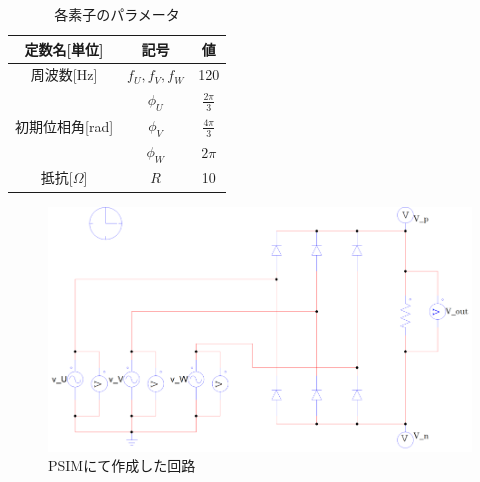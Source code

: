\documentclass[a4paper,12pt]{jarticle}
\begin{document}
\begin{table}[htb]
  \begin{center}
    \caption{各素子のパラメータ}
    \begin{tabular}{c|c|c} \hline
      定数名[単位] & 記号 & 値 \\ \hline \hline
      周波数[Hz] & $f_U,f_V,f_W$ & 120 \\ \hline
                     & $\phi_U$ & $\frac{2\pi}{3}$ \\
      初期位相角[rad] & $\phi_V$ & $\frac{4\pi}{3}$ \\
                     & $\phi_W$ & $2\pi$ \\ \hline
      抵抗[$\Omega$] & $R$ & 10 \\ \hline
    \end{tabular}
    \label{param}
  \end{center}
\end{table}

\begin{figure}[tb]
 \begin{center}
  \includegraphics[scale=1.3]{../figure/circuit_rere.eps}
  \caption{PSIMにて作成した回路}
  \label{circuit2}
 \end{center}
\end{figure}
\end{document}
